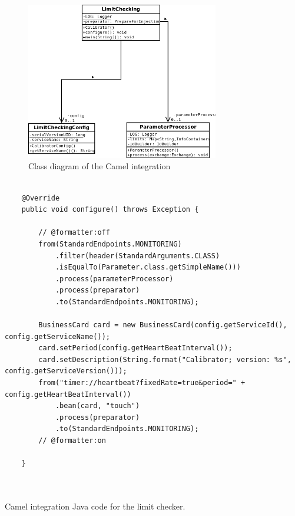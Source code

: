 \begin{figure}[H]
\centerline{\includegraphics[width=0.75\textwidth]{images/LimitCheckingCamelClassDiagram.png}}
\caption{Class diagram of the Camel integration}
\label{f5.7}
\end{figure}
\pagebreak
\begin{table}[H]
\lstset{language=Java}
\begin{lstlisting}

    @Override
    public void configure() throws Exception {

        // @formatter:off
        from(StandardEndpoints.MONITORING)
            .filter(header(StandardArguments.CLASS)
            .isEqualTo(Parameter.class.getSimpleName()))
            .process(parameterProcessor)
            .process(preparator)
            .to(StandardEndpoints.MONITORING);
        
        BusinessCard card = new BusinessCard(config.getServiceId(), config.getServiceName());
        card.setPeriod(config.getHeartBeatInterval());
        card.setDescription(String.format("Calibrator; version: %s", config.getServiceVersion()));
        from("timer://heartbeat?fixedRate=true&period=" + config.getHeartBeatInterval())
            .bean(card, "touch")
            .process(preparator)
            .to(StandardEndpoints.MONITORING);
        // @formatter:on

    }



\end{lstlisting}
\caption{Camel integration Java code for the limit checker.}
\label{Table5.5}
\end{table}

\pagebreak

